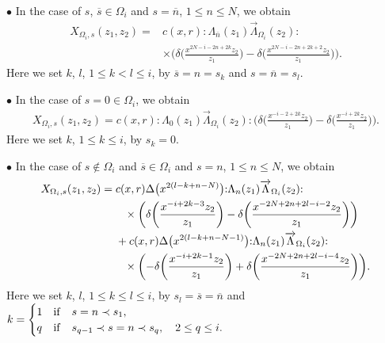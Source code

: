 \documentclass[pdftex]{sigma}
\numberwithin{equation}{section}
\begin{document}
\noindent
$\bullet$
In the case of $s$, $\overline{s} \in \Omega_i$ and $s=\overline{n}$,
$1\leq n \leq N$, we obtain
\begin{align}
X_{\Omega_i,s}(z_1,z_2)={}&
c(x,r){:}\Lambda_{\overline{n}}(z_1)\overrightarrow{\Lambda}_{\Omega_i}(z_2){:}\nonumber
\\
&\times\bigg(\delta\bigg(\frac{x^{2N-i-2n+2k}z_2}{z_1}\bigg)-
\delta\bigg(\frac{x^{2N-i-2n+2k+2} z_2}{z_1}\bigg)\bigg).
\label{exchange:L4}
\end{align}
Here we set $k$, $l$, $1\leq k<l \leq i$,
by $\overline{s}=n=s_k$ and $s=\overline{n}=s_l$.

\noindent
$\bullet$
In the case of $s=0 \in \Omega_i$, we obtain
\begin{gather}
{X_{\Omega_i,s}(z_1,z_2)}=
c(x,r){:}\Lambda_{0}(z_1)\overrightarrow{\Lambda}_{\Omega_i}(z_2){:}
\bigg(\delta\bigg(\frac{x^{-i-2+2k}z_2}{z_1}\bigg)-
\delta\bigg(\frac{x^{-i+2k} z_2}{z_1}\bigg)\bigg).
\label{exchange:L5}
\end{gather}
Here we set $k$, $1\leq k \leq i$, by $s_k=0$.

\noindent
$\bullet$
In the case of $s \notin \Omega_i$ and $ \overline{s} \in \Omega_i$
and $s=n$, $1\leq n \leq N$, we obtain
\begin{align}
X_{\Omega_i,s}(z_1,z_2)={}&c(x,r)\Delta\big(x^{2(l-k+n-N)}\big)
{:}\Lambda_{n}(z_1)\overrightarrow{\Lambda}_{\Omega_i}(z_2){:}\notag
\\
&\phantom{+}\times\bigg(\delta\bigg(\frac{x^{-i+2k-3}z_2}{z_1}\bigg)-
\delta\bigg(\frac{x^{-2N+2n+2l-i-2} z_2}{z_1}\bigg)\bigg)
\notag
\\
&+c(x,r)\Delta\big(x^{2(l-k+n-N-1)}\big)
{:}\Lambda_{n}(z_1)\overrightarrow{\Lambda}_{\Omega_i}(z_2){:}\notag
\\
&\phantom{+}\times\bigg({-}\delta\bigg(\frac{x^{-i+2k-1}z_2}{z_1}\bigg)+
\delta\bigg(\frac{x^{-2N+2n+2l-i-4} z_2}{z_1}\bigg)\bigg).
\label{exchange:L6}
\end{align}
Here we set $k$, $l$, $1 \leq k \leq l \leq i$, by $s_l=\overline{s}=\overline{n}$ and
$k=\begin{cases}
1&{\rm if}\quad s=n\prec s_1,\\
q&{\rm if}\quad s_{q-1}\prec s=n \prec s_q,\quad 2 \leq q \leq i.
\end{cases}$
\end{document}
